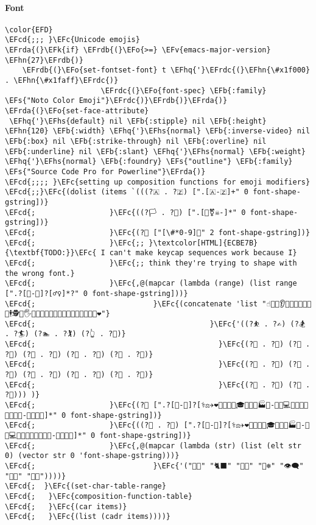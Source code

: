 \documentclass[a4wide,10pt]{article}
\newcommand{\EFc}[1]{\textcolor{EFc}{#1}} %
\newcommand{\EFcd}[1]{\textcolor{EFcd}{#1}} %
\newcommand{\EFs}[1]{\textcolor{EFs}{#1}} %
\newcommand{\EFk}[1]{\textcolor{EFk}{#1}} %
\newcommand{\EFb}[1]{\textcolor{EFb}{#1}} %
\newcommand{\EFv}[1]{\textcolor{EFv}{#1}} %
\newcommand{\EFo}[1]{\textcolor{EFo}{#1}} %
\newcommand{\EFhn}[1]{\textcolor{EFhn}{\textbf{#1}}} %
\newcommand{\EFhq}[1]{\textcolor{EFhq}{#1}} %
\newcommand{\EFhs}[1]{\textcolor{EFhs}{#1}} %
\newcommand{\EFrda}[1]{\textcolor{EFrda}{#1}} %
\newcommand{\EFrdb}[1]{\textcolor{EFrdb}{#1}} %
\newcommand{\EFrdc}[1]{\textcolor{EFrdc}{#1}} %
\begin{document}
\paragraph{Font}
\label{sec:orga18b2f0}
\begin{Code}
\begin{Verbatim}
\color{EFD}
\EFcd{;;; }\EFc{Unicode emojis}
\EFrda{(}\EFk{if} \EFrdb{(}\EFo{>=} \EFv{emacs-major-version} \EFhn{27}\EFrdb{)}
    \EFrdb{(}\EFo{set-fontset-font} t \EFhq{'}\EFrdc{(}\EFhn{\#x1f000} . \EFhn{\#x1faff}\EFrdc{)}
                      \EFrdc{(}\EFo{font-spec} \EFb{:family} \EFs{"Noto Color Emoji"}\EFrdc{)}\EFrdb{)}\EFrda{)}
\EFrda{(}\EFo{set-face-attribute}
 \EFhq{'}\EFhs{default} nil \EFb{:stipple} nil \EFb{:height} \EFhn{120} \EFb{:width} \EFhq{'}\EFhs{normal} \EFb{:inverse-video} nil \EFb{:box} nil \EFb{:strike-through} nil \EFb{:overline} nil \EFb{:underline} nil \EFb{:slant} \EFhq{'}\EFhs{normal} \EFb{:weight} \EFhq{'}\EFhs{normal} \EFb{:foundry} \EFs{"outline"} \EFb{:family} \EFs{"Source Code Pro for Powerline"}\EFrda{)}
\EFcd{;;;; }\EFc{setting up composition functions for emoji modifiers}
\EFcd{;;}\EFc{(dolist (items `(((?🇦 . ?🇿) [".[🇦-🇿]+" 0 font-shape-gstring])}
\EFcd{;                 }\EFc{((?🏳 . ?🏴) [".[️‍🌈⚧☠󠀠-󠁿]*" 0 font-shape-gstring])}
\EFcd{;                 }\EFc{(?⃣ ["[\#*0-9]️⃣" 2 font-shape-gstring])}
\EFcd{;                 }\EFc{;; }\textcolor[HTML]{ECBE7B}{\textbf{TODO:}}\EFc{ I can't make keycap sequences work because I}
\EFcd{;                 }\EFc{;; think they're trying to shape with the wrong font.}
\EFcd{;                 }\EFc{,@(mapcar (lambda (range) (list range [".‍?[🏻-🏿]?[‍️♂♀]*️?" 0 font-shape-gstring]))}
\EFcd{;                           }\EFc{(concatenate 'list "☝🎅🏇👂👃👦👧👼💏💑💪🕴🕵🕺🖐🖕🖖🙇🚣🛀🛌🤏🤞🤟🤦🤽🤾🥷🦻👯❤"}
\EFcd{;                                        }\EFc{'((?⛹ . ?✍) (?🏂 . ?🏄) (?🏊 . ?🏌) (?👆 . ?👐)}
\EFcd{;                                          }\EFc{(?👫 . ?👮) (?👰 . ?👸) (?💁 . ?💇) (?🙅 . ?🙇) (?🙋 . ?🙏)}
\EFcd{;                                          }\EFc{(?🚴 . ?🚶) (?🤘 . ?🤜) (?🤰 . ?🤹) (?🤼 . ?🤾) (?🦵 . ?🦹)}
\EFcd{;                                          }\EFc{(?🧍 . ?🧏) (?🧒 . ?🧟))) )}
\EFcd{;                 }\EFc{(?🧑 [".‍?[🏻-🏿]?[‍⚕⚖✈❤️🌾🍳🍼🎄🎓🎤🎨🏫🏭👦-👩💋💻💼🔧🔬🚀🚒🤝🦯🦰-🦳🦼🦽🧑]*" 0 font-shape-gstring])}
\EFcd{;                 }\EFc{((?👨 . ?👩) [".‍?[🏻-🏿]?[‍⚕⚖✈❤️🌾🍳🍼🎄🎓🎤🎨🏫🏭👦-👩💋💻💼🔧🔬🚀🚒🤝🦯🦰-🦳🦼🦽🧑]*" 0 font-shape-gstring])}
\EFcd{;                 }\EFc{,@(mapcar (lambda (str) (list (elt str 0) (vector str 0 'font-shape-gstring)))}
\EFcd{;                           }\EFc{'("😶‍🌫️" "🐈‍⬛" "🐕‍🦺" "🐻‍❄️" "👁️‍🗨️" "😮‍💨" "😵‍💫"))))}
\EFcd{;  }\EFc{(set-char-table-range}
\EFcd{;   }\EFc{composition-function-table}
\EFcd{;   }\EFc{(car items)}
\EFcd{;   }\EFc{(list (cadr items))))}


\end{Verbatim}
\end{Code}
\end{document}
